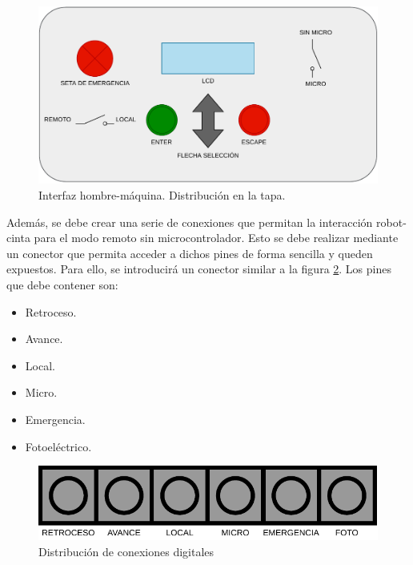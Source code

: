 \begin{figure}[htbp]
	\centering
	\includegraphics[width=\textwidth]{01-introduccion/HMI.pdf}
	\caption{Interfaz hombre-máquina. Distribución en la tapa.}
	\label{fig:interfazhmi}
	\end{figure}

Además, se debe crear una serie de conexiones que permitan la interacción robot-cinta para el modo remoto sin microcontrolador.
Esto se debe realizar mediante un conector que permita acceder a dichos pines de forma sencilla y queden expuestos.
Para ello, se introducirá un conector similar a la figura \ref{fig:digitales}. Los pines que debe contener son:
\begin{itemize}
	\item Retroceso.
 	\item Avance.
	\item Local.
	\item Micro.
	\item Emergencia.
  	\item Fotoeléctrico.	
\end{itemize}

\begin{figure}[htbp]
	\centering
	\includegraphics[scale=0.75]{01-introduccion/DIGITALES.pdf}
	\caption{Distribución de conexiones digitales}
	\label{fig:digitales}
	\end{figure}